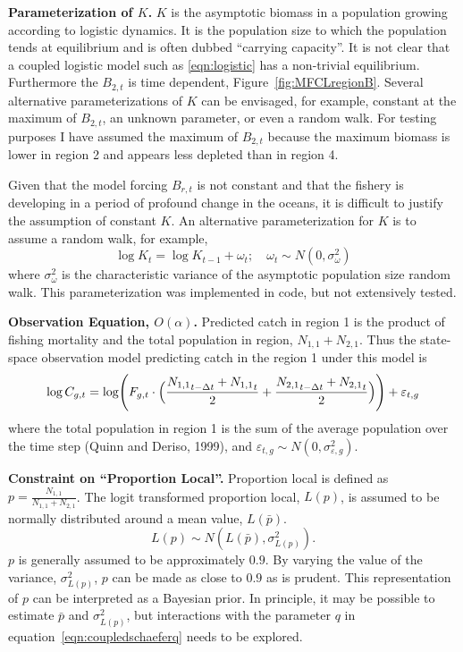 \documentclass[12pt,letterpaper]{article}
\newcommand\None{{N_{1,1}}}
\newcommand\Ntwo{{N_{2,1}}}
\newcommand\Nsum{{N_{1,1}+N_{2,1}}}
\begin{document}
{\bf Parameterization of $K$.}
$K$ is the asymptotic biomass in a population growing according to
logistic dynamics. It is the population size to which the population
tends at equilibrium and is often dubbed ``carrying capacity''. 
It is not clear that a coupled logistic model such as
\ref{eqn:logistic} has a non-trivial equilibrium. Furthermore the
$B_{2,t}$ is time dependent, Figure~\ref{fig:MFCLregionB}.
Several alternative
parameterizations of $K$ can be envisaged, for example, constant at
the maximum of $B_{2,t}$, an unknown parameter, or even a random walk.
For testing purposes I have assumed the maximum of $B_{2,t}$ because
the maximum biomass is lower in region 2 and appears less depleted
than in region 4.

Given that the model forcing $B_{r,t}$ is not constant and that the
fishery is developing in a period of profound change in the oceans,
it is difficult to justify the assumption of constant $K$. An
alternative parameterization for $K$ is to assume a random walk, for
example,
\begin{equation}
\log K_t = \log K_{t-1} + \omega_t;\quad \omega_t\sim
N(0,\sigma^2_\omega) \label{eqn:Kwalk}
\end{equation}
where  $\sigma^2_\omega$ is the characteristic variance of the
asymptotic population size random walk.
This parameterization was implemented in code, but not extensively
tested.

{\bf Observation Equation, $O(\alpha)$.}
Predicted catch in region 1 is the product of fishing mortality
and the total population in region, $\None+\Ntwo$.
Thus the state-space observation model predicting catch in the region 1
under this model is
\begin{equation}
\log C_{g,t} = \log \Biggl(F_{g,t}\cdot\Bigl(\frac{\None_{t-\Delta t}+\None_t}{2}
                           +\frac{\Ntwo_{t-\Delta
t}+\Ntwo_t}{2}\Bigr)\Biggr) + \varepsilon_{t,g}
\label{eqn:obs}
\end{equation}
where the total population in region 1 is the sum of the average
population over the time step (Quinn and Deriso, 1999), and
$\varepsilon_{t,g} \sim N(0,\sigma^2_{\varepsilon,g})$.

{\bf Constraint on ``Proportion Local''.}
Proportion local is defined as $p = \frac{\None}{\Nsum}$. The logit
transformed proportion local, $L(p)$, is assumed to be normally
distributed around a mean value, $L(\bar{p})$.
\begin{equation}
\label{eqn:LpropL}
L(p)\sim N(L(\bar{p}),\sigma^2_{L(p)}).
\end{equation} 
$p$ is generally assumed to be approximately $0.9$. By varying the
value of the variance, $\sigma^2_{L(p)}$, $p$ can be made as
close to $0.9$ as is prudent.
This representation of $p$ can be interpreted as a Bayesian prior.
In principle, it may be possible to
estimate $\bar{p}$ and $\sigma^2_{L(p)}$, but interactions with
the parameter $q$ in equation~\ref{eqn:coupledschaeferq} needs to be
explored.
\end{document}
